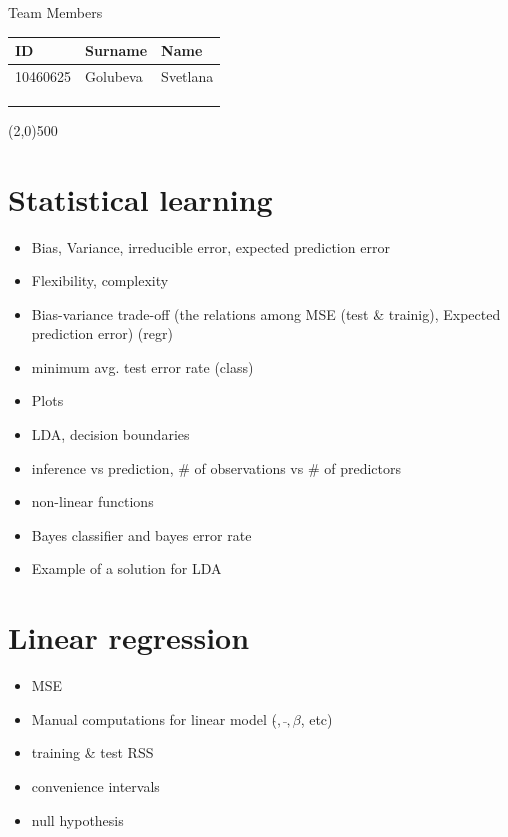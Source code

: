 \documentclass[a4paper,12pt,titlepage]{article} %
\begin{document}
\begin{titlepage}
		\vspace{20pt}
		
		\begin{center}
			{\large Team Members}
		\end{center}
		\begin{tabularx}{\textwidth}{|X|X|X|}
			\hline
			ID & Surname & Name\\
			\hline
			10460625 & Golubeva & Svetlana\\
			\hline
			&  & \\
			\hline
			&  & \\
			\hline
			&  & \\
			\hline
		\end{tabularx}
		
		\vspace{\fill}
		\begin{center}
			\line(2,0){500}
		\end{center}
		
	\end{titlepage}
\tableofcontents

\newpage
\section{Statistical learning}
\begin{itemize}
	\item Bias, Variance, irreducible error, expected prediction error
	\item Flexibility, complexity
	\item Bias-variance trade-off (the relations among MSE (test \& trainig), Expected prediction error) (regr)
	\item minimum avg. test error rate (class)
	\item Plots
	\item LDA, decision boundaries
	\item inference vs prediction, \# of observations vs \# of predictors
	\item non-linear functions
	\item Bayes classifier and bayes error rate
	\item Example of a solution for LDA
\end{itemize}

\newpage
\section{Linear regression }
\begin{itemize}
	\item MSE
	\item Manual computations for linear model ($ \hat{}, \bar{}, \beta$, etc)
	\item training \& test RSS
	\item convenience intervals
	\item null hypothesis
\end{itemize}
\end{document}

